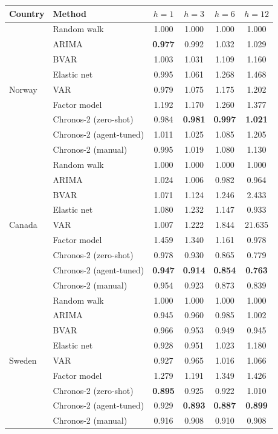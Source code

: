 \begin{tabular}{llcccc}
\toprule
Country & Method & $h{=}1$ & $h{=}3$ & $h{=}6$ & $h{=}12$ \\
\midrule
\multirow{9}{*}{Norway} & Random walk & 1.000 & 1.000 & 1.000 & 1.000 \\
 & ARIMA & \textbf{0.977} & 0.992 & 1.032 & 1.029 \\
 & BVAR & 1.003 & 1.031 & 1.109 & 1.160 \\
 & Elastic net & 0.995 & 1.061 & 1.268 & 1.468 \\
 & VAR & 0.979 & 1.075 & 1.175 & 1.202 \\
 & Factor model & 1.192 & 1.170 & 1.260 & 1.377 \\
 & Chronos-2 (zero-shot) & 0.984 & \textbf{0.981} & \textbf{0.997} & \textbf{1.021} \\
 & Chronos-2 (agent-tuned) & 1.011 & 1.025 & 1.085 & 1.205 \\
 & Chronos-2 (manual) & 0.995 & 1.019 & 1.080 & 1.130 \\
\midrule
\multirow{9}{*}{Canada} & Random walk & 1.000 & 1.000 & 1.000 & 1.000 \\
 & ARIMA & 1.024 & 1.006 & 0.982 & 0.964 \\
 & BVAR & 1.071 & 1.124 & 1.246 & 2.433 \\
 & Elastic net & 1.080 & 1.232 & 1.147 & 0.933 \\
 & VAR & 1.007 & 1.222 & 1.844 & 21.635 \\
 & Factor model & 1.459 & 1.340 & 1.161 & 0.978 \\
 & Chronos-2 (zero-shot) & 0.978 & 0.930 & 0.865 & 0.779 \\
 & Chronos-2 (agent-tuned) & \textbf{0.947} & \textbf{0.914} & \textbf{0.854} & \textbf{0.763} \\
 & Chronos-2 (manual) & 0.954 & 0.923 & 0.873 & 0.839 \\
\midrule
\multirow{9}{*}{Sweden} & Random walk & 1.000 & 1.000 & 1.000 & 1.000 \\
 & ARIMA & 0.945 & 0.960 & 0.985 & 1.002 \\
 & BVAR & 0.966 & 0.953 & 0.949 & 0.945 \\
 & Elastic net & 0.928 & 0.951 & 1.023 & 1.180 \\
 & VAR & 0.927 & 0.965 & 1.016 & 1.066 \\
 & Factor model & 1.279 & 1.191 & 1.349 & 1.426 \\
 & Chronos-2 (zero-shot) & \textbf{0.895} & 0.925 & 0.922 & 1.010 \\
 & Chronos-2 (agent-tuned) & 0.929 & \textbf{0.893} & \textbf{0.887} & \textbf{0.899} \\
 & Chronos-2 (manual) & 0.916 & 0.908 & 0.910 & 0.908 \\
\bottomrule
\end{tabular}
